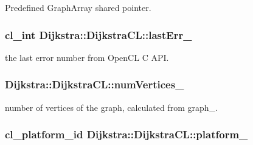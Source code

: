 Predefined Graph\+Array shared pointer. 

\hypertarget{class_dijkstra_1_1_dijkstra_c_l_aa4eec2b97cdd4a59fd814035736f0137}{
\subsubsection[{last\+Err\+\_\+}]{\setlength{\rightskip}{0pt plus 5cm}cl\+\_\+int Dijkstra\+::\+Dijkstra\+C\+L\+::last\+Err\+\_\+\hspace{0.3cm}{\ttfamily [private]}}}\label{class_dijkstra_1_1_dijkstra_c_l_aa4eec2b97cdd4a59fd814035736f0137}


the last error number from Open\+C\+L C A\+P\+I. 

\hypertarget{class_dijkstra_1_1_dijkstra_c_l_a282256a0fd3793379edae35783130833}{
\subsubsection[{num\+Vertices\+\_\+}]{ Dijkstra\+::\+Dijkstra\+C\+L\+::num\+Vertices\+\_\+\hspace{0.3cm}{\ttfamily [private]}}}\label{class_dijkstra_1_1_dijkstra_c_l_a282256a0fd3793379edae35783130833}


number of vertices of the graph, calculated from graph\+\_\+. 

\hypertarget{class_dijkstra_1_1_dijkstra_c_l_a48fb6896749198f8ecca726b887bac86}{
\subsubsection[{platform\+\_\+}]{\setlength{\rightskip}{0pt plus 5cm}cl\+\_\+platform\+\_\+id Dijkstra\+::\+Dijkstra\+C\+L\+::platform\+\_\+\hspace{0.3cm}{\ttfamily [private]}}}\label{class_dijkstra_1_1_dijkstra_c_l_a48fb6896749198f8ecca726b887bac86}


